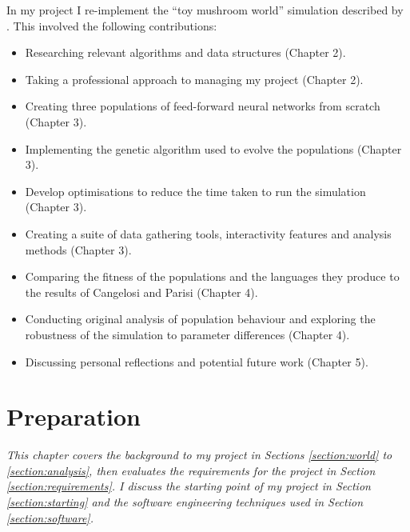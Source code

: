 \documentclass[12pt,a4paper]{report}
\begin{document}
In my project I re-implement the ``toy mushroom world'' simulation described by \citet{Cangelosi1998}. This involved the following contributions:
\begin{itemize}
	\itemsep0em
	\item Researching relevant algorithms and data structures (Chapter 2).
	\item Taking a professional approach to managing my project (Chapter 2).
	\item Creating three populations of feed-forward neural networks from scratch (Chapter 3).
	\item Implementing the genetic algorithm used to evolve the populations (Chapter 3).
	\item Develop optimisations to reduce the time taken to run the simulation (Chapter 3).
	\item Creating a suite of data gathering tools, interactivity features and analysis methods (Chapter 3).
	\item Comparing the fitness of the populations and the languages they produce to the results of Cangelosi and Parisi (Chapter 4).
	\item Conducting original analysis of population behaviour and exploring the robustness of the simulation to parameter differences (Chapter 4).
	\item Discussing personal reflections and potential future work (Chapter 5).
\end{itemize}


\chapter{Preparation}\label{chapter:preparation}

\emph{This chapter covers the background to my project in Sections \ref{section:world} to \ref{section:analysis}, then evaluates the requirements for the project in Section \ref{section:requirements}. I discuss the starting point of my project in Section \ref{section:starting} and the software engineering techniques used in Section \ref{section:software}.}
\end{document}
